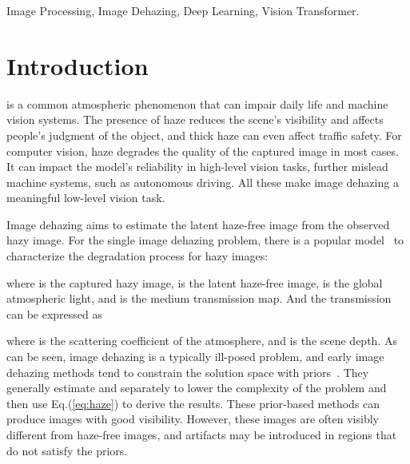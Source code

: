 \documentclass[journal]{IEEEtran}
\begin{document}
\begin{IEEEkeywords}
  Image Processing, Image Dehazing, Deep Learning, Vision Transformer.
\end{IEEEkeywords}





\section{Introduction}

 is a common atmospheric phenomenon that can impair daily life and machine vision systems.
The presence of haze reduces the scene's visibility and affects people's judgment of the object, and thick haze can even affect traffic safety.
For computer vision, haze degrades the quality of the captured image in most cases. 
It can impact the model's reliability in high-level vision tasks, further mislead machine systems, such as autonomous driving.
All these make image dehazing a meaningful low-level vision task.

Image dehazing aims to estimate the latent haze-free image from the observed hazy image.
For the single image dehazing problem, there is a popular model~\cite{mccartney1976optics,nayar1999vision,narasimhan2002vision} to characterize the degradation process for hazy images:

where  is the captured hazy image,  is the latent haze-free image,  is the global atmospheric light, and  is the medium transmission map.
And the transmission can be expressed as 

where  is the scattering coefficient of the atmosphere, and  is the scene depth.
As can be seen, image dehazing is a typically ill-posed problem, and early image dehazing methods tend to constrain the solution space with priors~\cite{he2010single,fattal2014dehazing,zhu2015fast,berman2016non}.
They generally estimate  and  separately to lower the complexity of the problem and then use Eq.(\ref{eq:haze}) to derive the results.
These prior-based methods can produce images with good visibility. 
However, these images are often visibly different from haze-free images, and artifacts may be introduced in regions that do not satisfy the priors.
\end{document}
